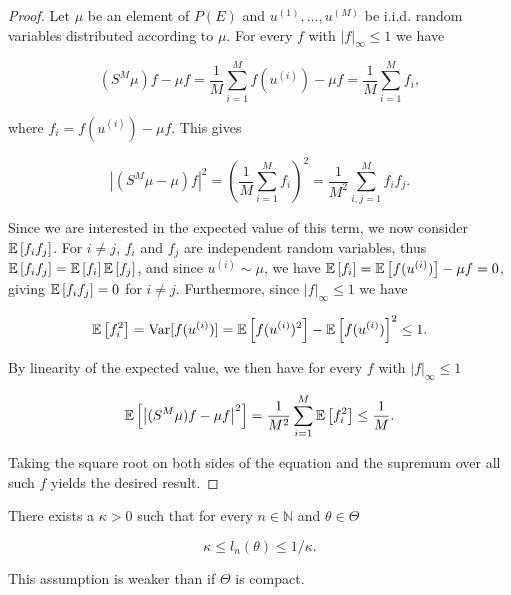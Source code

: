\begin{proof}
  Let $\mu$ be an element of $P(E)$ and $u^{(1)}, \ldots, u^{(M)}$ be i.i.d. random variables distributed according to $\mu$. For every $f$ with $|f|_\infty \le 1$ we have 
  
  \begin{equation*}
    (S^M\mu)f - \mu f = \frac1{M}\sum_{i=1}^Mf(u^{(i)}) - \mu f = \frac1{M}\sum_{i=1}^Mf_i,
  \end{equation*}

  where $f_i = f(u^{(i)}) - \mu f$. This gives

  \begin{equation*}
    \left|(S^M\mu - \mu)f\right|^2
    = \left(\frac1{M}\sum_{i=1}^Mf_i\right)^2
    = \frac1{M^2}\sum_{i,j=1}^Mf_if_j.
  \end{equation*}

  Since we are interested in the expected value of this term, we now consider $\mathbb{E}\left[f_if_j\right]$. For $i \neq j$, $f_i$ and $f_j$ are independent random variables, thus $\mathbb{E}\left[f_if_j\right] = \mathbb{E}\left[f_i\right]\mathbb{E}\left[f_j\right]$, and since $u^{(i)} \sim \mu$, we have $\mathbb{E}\left[f_i\right] = \mathbb{E}\left[f(u^{(i)})\right] - \mu f = 0$, giving $\mathbb{E}\left[f_if_j\right] = 0$ for $i \neq j$. Furthermore, since $|f|_\infty \le 1$ we have

  \begin{equation*}
    \mathbb{E}\left[f_i^2\right] = \text{Var}[f(u^{(i)})] = \mathbb{E}\left[f(u^{(i)})^2\right] - \mathbb{E}\left[f(u^{(i)})\right]^2 \leq 1.
  \end{equation*}

  By linearity of the expected value, we then have for every $f$ with $|f|_\infty \le 1$

  \begin{equation*}
    \mathbb{E}\left[\left|(S^M\mu)f - \mu f\right|^2\right] = \frac1{M^2}\sum_{i=1}^M\mathbb{E}\left[f_i^2\right] \le \frac1{M}.
  \end{equation*}

  Taking the square root on both sides of the equation and the supremum over all such $f$ yields the desired result.
\end{proof}

\begin{assumption}\label{kappa-assumption}
  There exists a $\kappa > 0$ such that for every $n \in \mathbb{N}$ and $\theta \in \Theta$

  \begin{equation*}
    \kappa \leq l_n(\theta) \leq 1/\kappa.
  \end{equation*}

  This assumption is weaker than  if $\Theta$ is compact.
\end{assumption}

